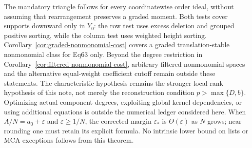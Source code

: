\begin{remark}
The mandatory triangle follows for every coordinatewise order ideal,
without assuming that rearrangement preserves a graded moment. Both tests cover supports downward only in $Y_0$: the row test uses
excess deletion and grouped positive sorting, while the column test uses
weighted height sorting. Corollary~\ref{cor:graded-nonmonomial-cost} covers a graded translation-stable nonmonomial
class for Eq63 only. Beyond the degree restriction in Corollary~\ref{cor:filtered-nonmonomial-cost},
arbitrary filtered nonmonomial spaces and the
alternative equal-weight coefficient cutoff remain outside these statements. The characteristic hypothesis remains the stronger
local-rank hypothesis of this note, not merely the reconstruction
condition $p>\max\{D,b\}$. Optimizing actual component degrees, exploiting
global kernel dependencies, or using additional equations is outside the
numerical ledger considered here. When $A/N=a_0+\varepsilon$ and
$\varepsilon\ge1/N$, the corrected margin $\varepsilon_*$ is
$\Theta(\varepsilon)$ as $N$ grows; near rounding one must retain its
explicit formula. No intrinsic lower bound on lists or MCA exceptions
follows from this theorem.
\end{remark}
